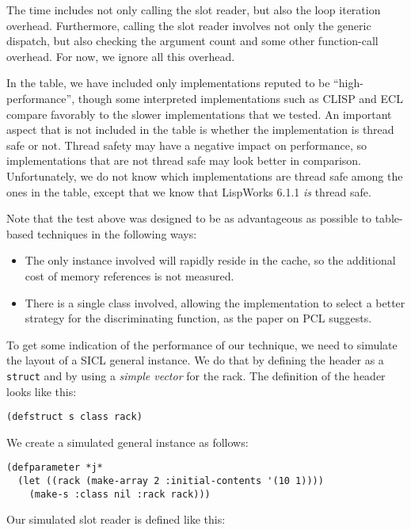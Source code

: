 The time includes not only calling the slot reader, but also the loop
iteration overhead.  Furthermore, calling the slot reader involves not
only the generic dispatch, but also checking the argument count and
some other function-call overhead.  For now, we ignore all this
overhead.

In the table, we have included only implementations reputed to be
``high-performance'', though some interpreted implementations such as
CLISP and ECL compare favorably to the slower implementations that we
tested.  An important aspect that is not included in the table is
whether the implementation is thread safe or not.  Thread safety may
have a negative impact on performance, so implementations that are not
thread safe may look better in comparison.  Unfortunately, we do not
know which implementations are thread safe among the ones in the
table, except that we know that LispWorks 6.1.1 \emph{is} thread
safe. 

Note that the test above was designed to be as advantageous as
possible to table-based techniques in the following ways:

\begin{itemize}
\item The only instance involved will rapidly reside in the cache, so
  the additional cost of memory references is not measured.
\item There is a single class involved, allowing the implementation to
  select a better strategy for the discriminating function, as the
  paper on PCL suggests. 
\end{itemize}

To get some indication of the performance of our technique, we need to
simulate the layout of a SICL general instance.  We do that by
defining the header as a \cl{} \texttt{struct} and by using a
\emph{simple vector} for the rack.  The definition of the header looks
like this:

\begin{verbatim}
(defstruct s class rack)
\end{verbatim}

We create a simulated general instance as follows:

\begin{verbatim}
(defparameter *j* 
  (let ((rack (make-array 2 :initial-contents '(10 1))))
    (make-s :class nil :rack rack)))
\end{verbatim}

Our simulated slot reader is defined like this:

